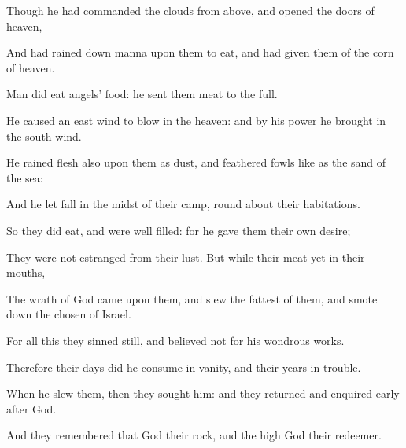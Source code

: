 {\par }{\Q {}Though he had
commanded the
clouds from
above, and
opened the
doors of
heaven,


\par }{\Q {}And had rained
down
manna upon them to
eat, and had
given them of the
corn of
heaven.


\par }{\Q {}Man did
eat
angels’
food: he
sent them
meat to the
full.


\par }{\Q {}He caused an east
wind to
blow in the
heaven: and by his
power he brought
in the south
wind.


\par }{\Q {}He
rained
flesh also upon them as
dust, and
feathered
fowls like as the
sand of the
sea:


\par }{\Q {}And he let
{}
fall in the
midst of their
camp, round
about their
habitations.


\par }{\Q {}So they did
eat, and were
well
filled: for he
gave them their own
desire;


\par }{\Q {}They were not
estranged from their
lust. But while their
meat
{} yet in their
mouths,


\par }{\Q {}The
wrath of
God
came upon them, and
slew the
fattest of them, and smote
down the
chosen
{} of
Israel.


\par }{\Q {}For all this they
sinned still, and
believed not for his wondrous
works.


\par }{\Q {}Therefore their
days did he
consume in
vanity, and their
years in
trouble.


\par }{\Q {}When he
slew them, then they
sought him: and they
returned and enquired
early after
God.


\par }{\Q {}And they
remembered that
God
{} their
rock, and the
high
God their
redeemer.


}
